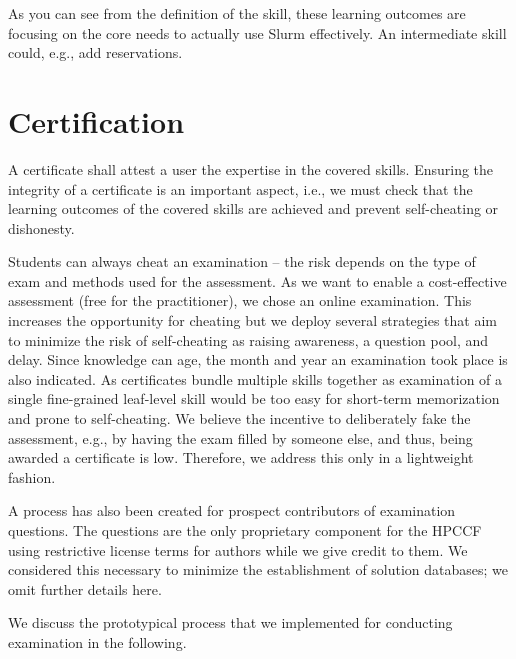 \documentclass[jocse]{jocseart}
\begin{document}
As you can see from the definition of the skill, these learning outcomes are focusing on the core needs to actually use Slurm effectively.
An intermediate skill could, e.g., add reservations.



\section{Certification}
\label{sec:certification}

A certificate shall attest a user the expertise in the covered skills.
Ensuring the integrity of a certificate is an important aspect, i.e., we must check that the learning outcomes of the covered skills are achieved and prevent self-cheating or dishonesty.

Students can always cheat an examination -- the risk depends on the type of exam and methods used for the assessment.
As we want to enable a cost-effective assessment (free for the practitioner), we chose an online examination.
This increases the opportunity for cheating \cite{rowe2004cheating} but we deploy several  strategies that aim to minimize the risk of self-cheating as raising awareness, a question pool, and delay.
Since knowledge can age, the month and year an examination took place is also indicated.
As certificates bundle multiple skills together as examination of a single fine-grained leaf-level skill would be too easy for short-term memorization and prone to self-cheating.
We believe the incentive to deliberately fake the assessment, e.g., by having the exam filled by someone else, and thus, being awarded a certificate is low.
Therefore, we address this only in a lightweight fashion.

A process has also been created for prospect contributors of examination questions.
The questions are the only proprietary component for the HPCCF using restrictive license terms for authors while we give credit to them.
We considered this necessary to minimize the establishment of solution databases; we omit further details here.

We discuss the prototypical process that we implemented for conducting examination in the following.
\end{document}
